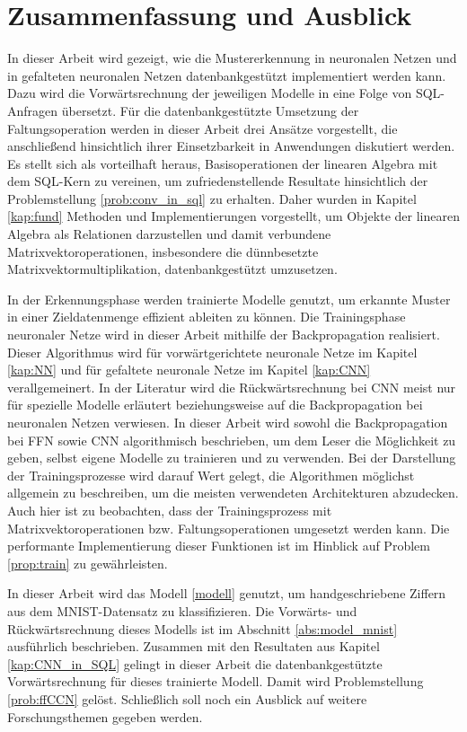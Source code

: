 \chapter{Zusammenfassung und Ausblick}
\label{kap:sum}

In dieser Arbeit wird gezeigt, wie die Mustererkennung in neuronalen Netzen und in gefalteten neuronalen Netzen datenbankgestützt implementiert werden kann. Dazu wird die Vorwärtsrechnung der jeweiligen Modelle in eine Folge von SQL-Anfragen übersetzt. Für die datenbankgestützte Umsetzung der Faltungsoperation werden in dieser Arbeit drei Ansätze vorgestellt, die anschließend hinsichtlich ihrer Einsetzbarkeit in Anwendungen diskutiert werden. Es stellt sich als vorteilhaft heraus, Basisoperationen der linearen Algebra mit dem SQL-Kern zu vereinen, um zufriedenstellende Resultate hinsichtlich der Problemstellung \ref{prob:conv_in_sql} zu erhalten. Daher wurden in Kapitel \ref{kap:fund} Methoden und Implementierungen vorgestellt, um Objekte der linearen Algebra als Relationen darzustellen und damit verbundene Matrixvektoroperationen, insbesondere die dünnbesetzte Matrixvektormultiplikation, datenbankgestützt umzusetzen.  

In der Erkennungsphase werden trainierte Modelle genutzt, um erkannte Muster in einer Zieldatenmenge effizient ableiten zu können. Die Trainingsphase neuronaler Netze wird in dieser Arbeit mithilfe der Backpropagation realisiert. Dieser Algorithmus wird für vorwärtgerichtete neuronale Netze im Kapitel \ref{kap:NN} und für gefaltete neuronale Netze im Kapitel \ref{kap:CNN} verallgemeinert. In der Literatur wird die Rückwärtsrechnung bei CNN meist nur für spezielle Modelle erläutert beziehungsweise auf die Backpropagation bei neuronalen Netzen verwiesen. In dieser Arbeit wird sowohl die Backpropagation bei FFN sowie CNN algorithmisch beschrieben, um dem Leser die Möglichkeit zu geben, selbst eigene Modelle zu trainieren und zu verwenden.
Bei der Darstellung der Trainingsprozesse wird darauf Wert gelegt, die Algorithmen möglichst allgemein zu beschreiben, um die meisten verwendeten Architekturen abzudecken. Auch hier ist zu beobachten, dass der Trainingsprozess mit Matrixvektoroperationen bzw. Faltungsoperationen umgesetzt werden kann. Die performante Implementierung dieser Funktionen ist im Hinblick auf Problem \ref{prop:train} zu gewährleisten. 

In dieser Arbeit wird das Modell \ref{modell} genutzt, um handgeschriebene Ziffern aus dem MNIST-Datensatz zu klassifizieren. Die Vorwärts- und Rückwärtsrechnung dieses Modells ist im Abschnitt \ref{abs:model_mnist} ausführlich beschrieben. Zusammen mit den Resultaten aus Kapitel \ref{kap:CNN_in_SQL} gelingt in dieser Arbeit die datenbankgestützte Vorwärtsrechnung für dieses trainierte Modell. Damit wird Problemstellung \ref{prob:ffCCN} gelöst. Schließlich soll noch ein Ausblick auf weitere Forschungsthemen gegeben werden.

